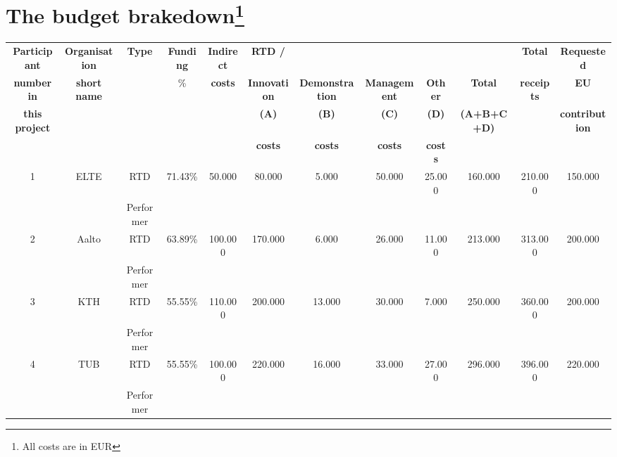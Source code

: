 \section{The budget brakedown\footnote{All costs are in EUR}}

\begin{center}
	\begin{adjustbox}{width=1\textwidth}
		\begin{tabular}{ |c|c|c|c|c|c|c|c|c|c|c|c|} 
			\hline
			\textbf{Participant} & \textbf{Organisation} & \textbf{Type} & \textbf{Funding} & \textbf{Indirect} & \textbf{RTD /} & ~ & ~ & ~ & \textbf{~} & \textbf{Total} & \textbf{Requested}\\
			
			\textbf{number in} & \textbf{short name} & ~ & \% & \textbf{costs} & \textbf{Innovation} & \textbf{Demonstration} & \textbf{Management} & \textbf{Other} & \textbf{Total} & \textbf{receipts} & \textbf{EU} \\
			
			\textbf{this project} & ~ & ~ & ~ & ~ & \textbf{(A)} & \textbf{(B)} & \textbf{(C)} & \textbf{(D)} & \textbf{(A+B+C+D)} & ~ & \textbf{contribution} \\
			
			~ & ~ & ~ & ~ & ~ & \textbf{costs} & \textbf{costs} & \textbf{costs} & \textbf{costs} & ~ & ~ & ~ \\
			\hline
			
			1 & ELTE & RTD & 71.43\% & 50.000 & 80.000 & 5.000 & 50.000 & 25.000 & 160.000 & 210.000 & 150.000 \\
			~ & ~ & Performer & ~ & ~ & ~ & ~ & ~ & ~ & ~ & ~ & \\
			\hline
			
			2 & Aalto & RTD & 63.89\% & 100.000 & 170.000 & 6.000 & 26.000 & 11.000 & 213.000 & 313.000 & 200.000 \\
			~ & ~ & Performer & ~ & ~ & ~ & ~ & ~ & ~ & ~ & ~ & \\
			\hline
			
			3 & KTH & RTD & 55.55\% & 110.000 & 200.000 & 13.000 & 30.000 & 7.000 & 250.000 & 360.000 & 200.000 \\
			~ & ~ & Performer & ~ & ~ & ~ & ~ & ~ & ~ & ~ & ~ &\\
			\hline
			
			4 & TUB & RTD & 55.55\% & 100.000 & 220.000 & 16.000 & 33.000 & 27.000 & 296.000 & 396.000 & 220.000 \\
			~ & ~ & Performer & ~ & ~ & ~ & ~ & ~ & ~ & ~ & ~ & \\
			\hline
			

\end{tabular}
\end{adjustbox}
\end{center}
